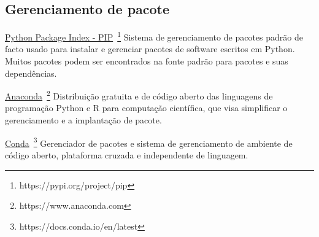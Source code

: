\subsection*{Gerenciamento de pacote}

\underline{Python Package Index - PIP}~\footnote{https://pypi.org/project/pip}
Sistema de gerenciamento de pacotes padrão de facto usado para instalar e gerenciar pacotes de software escritos em Python. 
Muitos pacotes podem ser encontrados na fonte padrão para pacotes e suas dependências.

\underline{Anaconda}~\footnote{https://www.anaconda.com} 
Distribuição gratuita e de código aberto das linguagens de programação Python e R para computação científica, que visa simplificar o gerenciamento e a implantação de pacote.

\underline{Conda}~\footnote{https://docs.conda.io/en/latest}
Gerenciador de pacotes e sistema de gerenciamento de ambiente de código aberto, plataforma cruzada e independente de linguagem.
